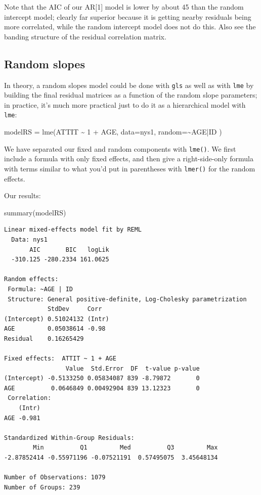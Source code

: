 \documentclass[
  letterpaper,
  DIV=11,
  numbers=noendperiod]{scrreprt}
\newenvironment{Shaded}{}{}
\newcommand{\AttributeTok}[1]{\textcolor[rgb]{0.49,0.56,0.16}{#1}}
\newcommand{\DecValTok}[1]{\textcolor[rgb]{0.25,0.63,0.44}{#1}}
\newcommand{\FunctionTok}[1]{\textcolor[rgb]{0.02,0.16,0.49}{#1}}
\newcommand{\NormalTok}[1]{#1}
\newcommand{\OtherTok}[1]{\textcolor[rgb]{0.00,0.44,0.13}{#1}}
\newcommand{\SpecialCharTok}[1]{\textcolor[rgb]{0.25,0.44,0.63}{#1}}
\begin{document}
Note that the AIC of our AR{[}1{]} model is lower by about 45 than the
random intercept model; clearly far superior because it is getting
nearby residuals being more correlated, while the random intercept model
does not do this. Also see the banding structure of the residual
correlation matrix.

\subsection{Random slopes}\label{random-slopes}

In theory, a random slopes model could be done with \texttt{gls} as well
as with \texttt{lme} by building the final residual matrices as a
function of the random slope parameters; in practice, it's much more
practical just to do it as a hierarchical model with \texttt{lme}:

\begin{Shaded}
\begin{Highlighting}[]
\NormalTok{modelRS }\OtherTok{=} \FunctionTok{lme}\NormalTok{(ATTIT }\SpecialCharTok{\textasciitilde{}} \DecValTok{1} \SpecialCharTok{+}\NormalTok{ AGE, }
              \AttributeTok{data=}\NormalTok{nys1,}
              \AttributeTok{random=}\SpecialCharTok{\textasciitilde{}}\NormalTok{AGE}\SpecialCharTok{|}\NormalTok{ID )}
\end{Highlighting}
\end{Shaded}

We have separated our fixed and random components with \texttt{lme()}.
We first include a formula with only fixed effects, and then give a
right-side-only formula with terms similar to what you'd put in
parentheses with \texttt{lmer()} for the random effects.

Our results:

\begin{Shaded}
\begin{Highlighting}[]
\FunctionTok{summary}\NormalTok{(modelRS)}
\end{Highlighting}
\end{Shaded}

\begin{verbatim}
Linear mixed-effects model fit by REML
  Data: nys1 
       AIC       BIC   logLik
  -310.125 -280.2334 161.0625

Random effects:
 Formula: ~AGE | ID
 Structure: General positive-definite, Log-Cholesky parametrization
            StdDev     Corr  
(Intercept) 0.51024132 (Intr)
AGE         0.05038614 -0.98 
Residual    0.16265429       

Fixed effects:  ATTIT ~ 1 + AGE 
                 Value  Std.Error  DF  t-value p-value
(Intercept) -0.5133250 0.05834087 839 -8.79872       0
AGE          0.0646849 0.00492904 839 13.12323       0
 Correlation: 
    (Intr)
AGE -0.981

Standardized Within-Group Residuals:
        Min          Q1         Med          Q3         Max 
-2.87852414 -0.55971196 -0.07521191  0.57495075  3.45648134 

Number of Observations: 1079
Number of Groups: 239 
\end{verbatim}
\end{document}
